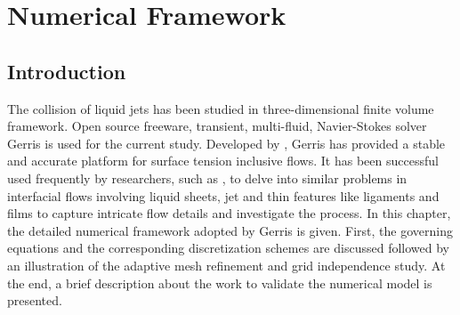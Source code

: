 \chapter{Numerical Framework}
\section{Introduction}
The collision of liquid jets has been studied in three-dimensional finite volume framework. Open source freeware, transient, multi-fluid, Navier-Stokes solver Gerris is used for the current study. Developed by \cite{Popinet2003,popinet2009}, Gerris has provided a stable and accurate platform for surface tension inclusive flows. It has been successful used frequently by researchers, such as \cite{chen2013high,kumar2016physical,kumar2017bending,kumar2017air}, to delve into similar problems in interfacial flows involving liquid sheets, jet and thin features like ligaments and films to capture intricate flow details and investigate the process. In this chapter, the detailed numerical framework adopted by Gerris is given. First, the governing equations and the corresponding discretization schemes are discussed followed by an illustration of the adaptive mesh refinement and grid independence study. At the end, a brief description about the work to validate the numerical model is presented.   
